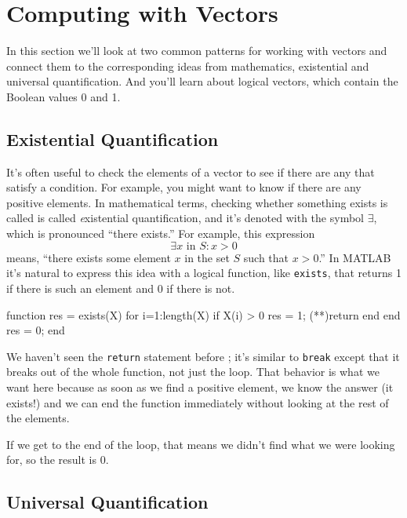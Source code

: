 \section{Computing with Vectors}

In this section we'll look at two common patterns for working with vectors and connect them to the corresponding ideas from mathematics, existential and universal quantification.  And you'll learn about logical vectors, which contain the Boolean values 0 and 1. 

\subsection{Existential Quantification}


It's often useful to check the elements of a vector to see if there
are any that satisfy a condition.  For example, you might want to
know if there are any positive elements.  In mathematical terms, checking whether something exists is called is called {\emph existential quantification}, and it's denoted with
the symbol $\exists$, which is pronounced ``there exists.''  For example,
this expression
%
\[ \exists x \mbox{~in~} S: x>0  \]
%
means, ``there exists some element $x$ in the set $S$ such that
$x>0$.''  In MATLAB it's natural to express this idea with a logical
function, like {\tt exists}, that returns 1 if there is such an
element and 0 if there is not.

\begin{code}
function res = exists(X)
    for i=1:length(X)
        if X(i) > 0
            res = 1;
            (**)return
        end
    end
    res = 0;
end
\end{code}

We haven't seen the {\tt return} statement before ; it's similar
to {\tt break} except that it breaks out of the whole function, not
just the loop.  That behavior is what we want here because as soon
as we find a positive element, we know the answer (it exists!) and
we can end the function immediately without looking at the rest
of the elements.


If we get to the end of the loop, that means we didn't find what
we were looking for, so the result is 0.

\subsection{Universal Quantification}

